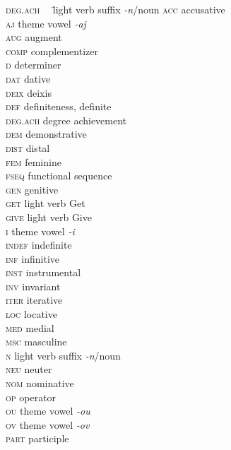 
\begin{multicols}{2}
\begin{tabbing}
\textsc{deg.ach}~~ \= light verb suffix \textit{-n}\slash noun\kill
\textsc{acc}		\>	accusative \\
\textsc{aj}			\>	theme vowel \textit{-aj}\\
\textsc{aug}		\>	augment\\
\textsc{comp}		\>	complementizer\\
\textsc{d}			\>	determiner\\
\textsc{dat}		\>	dative\\
\textsc{deix}		\>	deixis\\
\textsc{def}		\>	definiteness, definite\\
\textsc{deg.ach}	\>	degree achievement\\
\textsc{dem}		\>	demonstrative \\
\textsc{dist}		\>	distal\\
\textsc{fem}		\>	feminine\\
\textsc{fseq}		\>	functional sequence\\
\textsc{gen}		\>	genitive \\
\textsc{get}		\>	light verb Get\\
\textsc{give}		\>	light verb Give\\
\textsc{i}			\>	theme vowel \textit{-i}\\
\textsc{indef}		\>	indefinite\\
\textsc{inf}		\>	infinitive\\
\textsc{inst}		\>	instrumental\\
\textsc{inv}		\>	invariant\\
\textsc{iter}		\>	iterative\\
\textsc{loc}		\>	locative\\
\textsc{med}		\>	medial\\
\textsc{msc}		\>	masculine\\
\textsc{n}			\>	light verb suffix \textit{-n}\slash noun\\
\textsc{neu}		\>	neuter\\
\textsc{nom} 		\>	nominative \\
 \textsc{op}		\>	operator\\
 \textsc{ou}		\>	theme vowel \textit{-ou}\\
 \textsc{ov}		\>	theme vowel \textit{-ov}\\
\textsc{part}		\>	participle\\

\end{tabbing}
\end{multicols}
